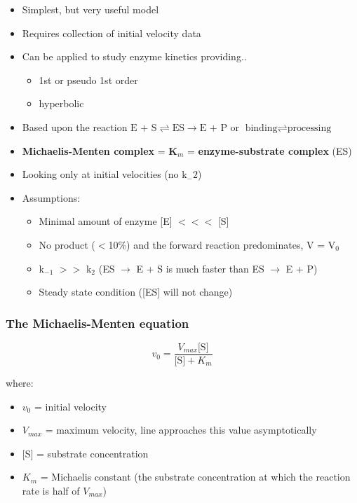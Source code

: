 \documentclass[letterpaper, 12pt]{article}
\begin{document}
\begin{itemize}
\item Simplest, but very useful model
\item Requires collection of initial velocity data
\item Can be applied to study enzyme kinetics providing..
\begin{itemize}
\item 1st or pseudo 1st order
\item hyperbolic
\end{itemize}
\item Based upon the reaction $\text{E + S} \rightleftharpoons \text{ES} \to \text{E + P}$ or $\text{binding} \rightleftharpoons \text{processing}$
\item \textbf{Michaelis-Menten complex} = \textbf{K$_m$} = \textbf{enzyme-substrate complex} (ES)
\item Looking only at initial velocities (no k$_-2$)
\item Assumptions:
\begin{itemize}
\item Minimal amount of enzyme [E] $<<<$ [S]
\item No product ($<$10\%) and the forward reaction predominates, V = V$_0$
\item k$_{-1}$ $>>$ k$_2$ (ES $\to$ E + S is much faster than ES $\to$ E + P)
\item Steady state condition ([ES] will not change)
\end{itemize}
\end{itemize}

\subsubsection*{The Michaelis-Menten equation}

\begin{equation}
v_0 = \frac{V_{max}\text{[S]}}{\text{[S]} + K_m}
\end{equation}

where:

\begin{itemize}
\item $v_0$ = initial velocity
\item $V_{max}$ = maximum velocity, line approaches this value asymptotically
\item $[$S$]$ = substrate concentration
\item $K_m$ = Michaelis constant (the substrate concentration at which the reaction rate is half of $V_{max}$)
\end{itemize}
\end{document}
